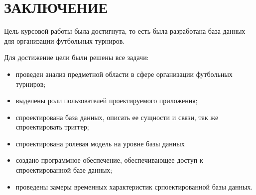 \section*{\centering ЗАКЛЮЧЕНИЕ}

Цель курсовой работы была достигнута, то есть была разработана база данных для организации футбольных турниров.

Для достижение цели были решены все задачи:

\begin{itemize}
	\item проведен анализ предметной области в сфере организации футбольных турниров;
	\item выделены роли пользователей проектируемого приложения;
	\item спроектирована база данных, описать ее сущности и связи, так же спроектировать триггер;
	\item спроектирована ролевая модель на уровне базы данных
	\item создано программное обеспечение, обеспечивающее доступ к спроектированной базе данных;
	\item проведены замеры временных характеристик српоектированной базы данных.  
\end{itemize}